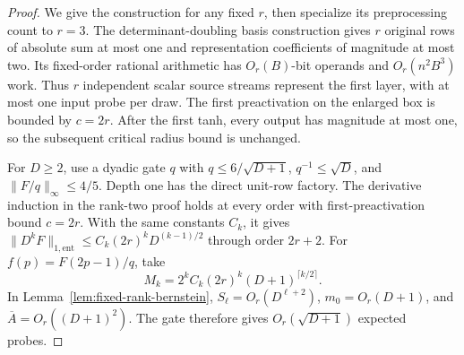 \begin{proof}
We give the construction for any fixed $r$, then specialize its
preprocessing count to $r=3$. The determinant-doubling basis
construction gives $r$ original rows of absolute sum at most one
and representation coefficients of magnitude at most two. Its
fixed-order rational arithmetic has $O_r(B)$-bit operands and
$O_r(n^2B^3)$ work. Thus $r$ independent scalar source streams
represent the first layer, with at most one input probe per draw.
The first preactivation on the enlarged box is bounded by $c=2r$.
After the first tanh, every output has magnitude at most one, so
the subsequent critical radius bound is unchanged.

For $D\ge2$, use a dyadic gate $q$ with
$q\le6/\sqrt{D+1}$, $q^{-1}\le\sqrt D$, and
$\|F/q\|_\infty\le4/5$. Depth one has the direct unit-row
factory. The derivative induction in the rank-two proof holds at
every order with first-preactivation bound $c=2r$. With the same
constants $C_k$, it gives $\|D^kF\|_{1,\mathrm{ent}}
\le C_k(2r)^kD^{(k-1)/2}$ through order $2r+2$.
For $f(p)=F(2p-1)/q$, take
\[
 M_k=2^kC_k(2r)^k(D+1)^{\lceil k/2\rceil}.
\]
In Lemma~\ref{lem:fixed-rank-bernstein},
$S_\ell=O_r(D^{\ell+2})$, $m_0=O_r(D+1)$, and
$\overline A=O_r((D+1)^2)$. The gate therefore gives
$O_r(\sqrt{D+1})$ expected probes.


\end{proof}
